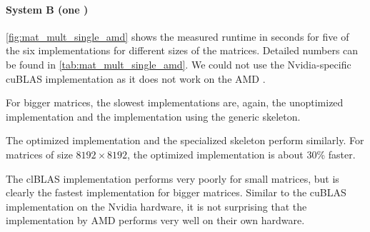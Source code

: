 \paragraph{System B (one \GPU)}
\autoref{fig:mat_mult_single_amd} shows the measured runtime in seconds for five of the six implementations for different sizes of the matrices.
Detailed numbers can be found in \autoref{tab:mat_mult_single_amd}.
We could not use the Nvidia-specific cuBLAS implementation as it does not work on the AMD \GPU.

For bigger matrices, the slowest implementations are, again, the unoptimized \OpenCL implementation and the implementation using the generic \allpairs skeleton.

The optimized \OpenCL implementation and the specialized \allpairs skeleton perform similarly.
For matrices of size $8192\times 8192$, the optimized \OpenCL implementation is about 30\% faster.

The clBLAS implementation performs very poorly for small matrices, but is clearly the fastest implementation for bigger matrices.
Similar to the cuBLAS implementation on the Nvidia hardware, it is not surprising that the implementation by AMD performs very well on their own hardware.


